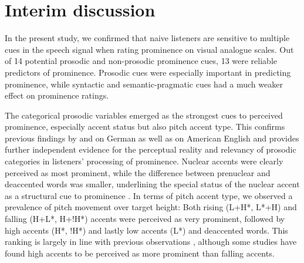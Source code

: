 \section{Interim discussion} \label{sec:s3_discussion}

In the present study, we confirmed that naive listeners are sensitive to multiple cues in the speech signal when rating prominence on visual analogue scales. Out of 14 potential prosodic and non-prosodic prominence cues, 13 were reliable predictors of prominence. Prosodic cues were especially important in predicting prominence, while syntactic and semantic-pragmatic cues had a much weaker effect on prominence ratings.

The categorical prosodic variables emerged as the strongest cues to perceived prominence, especially accent status but also pitch accent type. This confirms previous findings by \citet{baumannWhatMakesWord2018} and \citet{wagnerExploitingSpeechgestureLink2019} on German as well as \citet{bishopPhonologyPhoneticsSignalextrinsic2020} on American English and provides further independent evidence for the perceptual reality and relevancy of prosodic categories in listeners' processing of prominence. Nuclear accents were clearly perceived as most prominent, while the difference between prenuclear and deaccented words was smaller, underlining the special status of the nuclear accent as a structural cue to prominence \citep[e.g.,][]{buringSemanticsIntonationInformation2007, laddIntonationalPhonology2008}. In terms of pitch accent type, we observed a prevalence of pitch movement over target height: Both rising (L+H*, L*+H) and falling (H+L*, H+!H*) accents were perceived as very prominent, followed by high accents (H*, !H*) and lastly low accents (L*) and deaccented words. This ranking is largely in line with previous observations \citep[e.g.,][]{baumannPerceptualProminencePitch2015, baumannWhatMakesWord2018, bishopPhonologyPhoneticsSignalextrinsic2020}, although some studies have found high accents to be perceived as more prominent than falling accents.

